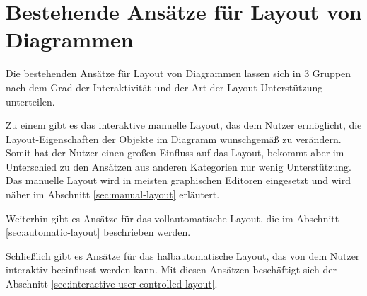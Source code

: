 
\chapter{Bestehende Ansätze für Layout von Diagrammen}

Die bestehenden Ansätze für Layout von Diagrammen lassen sich in 3 Gruppen nach dem Grad der Interaktivität und der Art der Layout-Unterstützung unterteilen.

Zu einem gibt es das interaktive manuelle Layout, das dem Nutzer ermöglicht, die Layout-Eigenschaften der Objekte im Diagramm wunschgemäß zu verändern. Somit hat der Nutzer einen großen Einfluss auf das Layout, bekommt aber im Unterschied zu den Ansätzen aus anderen Kategorien nur wenig Unterstützung. Das manuelle Layout wird in meisten graphischen Editoren eingesetzt und wird näher im Abschnitt \ref{sec:manual-layout} erläutert.

Weiterhin gibt es Ansätze für das vollautomatische Layout, die im Abschnitt \ref{sec:automatic-layout} beschrieben werden.

Schließlich gibt es Ansätze für das halbautomatische Layout, das von dem Nutzer interaktiv beeinflusst werden kann. Mit diesen Ansätzen beschäftigt sich der Abschnitt \ref{sec:interactive-user-controlled-layout}.





